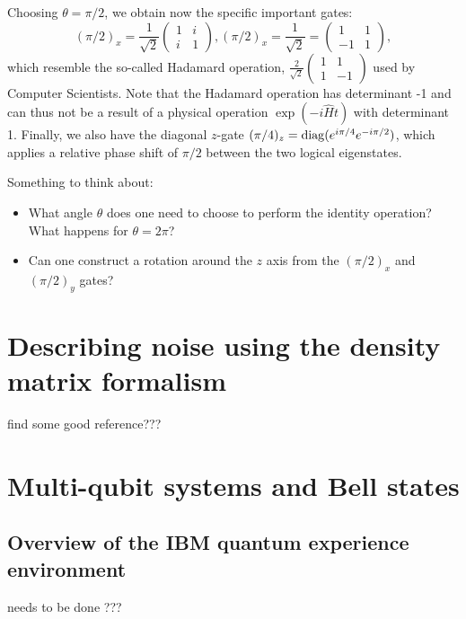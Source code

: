 \documentclass{../lab}
\begin{document}
Choosing $\theta = \pi/2$, we obtain now the specific important gates: 
\begin{equation}
(\pi/2)_x=\frac{1}{\sqrt{2}}\left(
\begin{array}{rr}
 1 & i \\ i & 1
\end{array}
\right), 
(\pi/2)_x=\frac{1}{\sqrt{2}}=\left(
\begin{array}{rr}
 1 & 1 \\ -1 & 1
\end{array}
\right),
\end{equation}
which resemble the so-called Hadamard
operation, $\frac{2}{\sqrt{2}}
\begin{pmatrix}1 &1 \\ 1 & -1
\end{pmatrix}$ used by Computer Scientists. Note that the Hadamard operation has determinant -1 and can thus not be a result of a physical operation $\exp(-i\hat{H}t)$ with determinant 1.  Finally, we also have the diagonal $z$-gate $(\pi/4)_z={\rm diag}(e^{i\pi/4} e^{-i\pi/2})$, which applies a relative phase shift of $\pi/2$ between the two logical eigenstates.  

Something to think about: 
\begin{itemize}
\item What angle $\theta$ does one need to choose to perform the identity operation? What happens for $\theta=2\pi$?
\item Can one construct a rotation around the $z$ axis from the $(\pi/2)_x$ and $(\pi/2)_y$ gates?
\end{itemize}

\section{Describing noise using the density matrix formalism}

find some good reference???

\section{Multi-qubit systems and Bell states}

\subsection{Overview of the IBM quantum experience environment}

needs to be done ???
\end{document}
